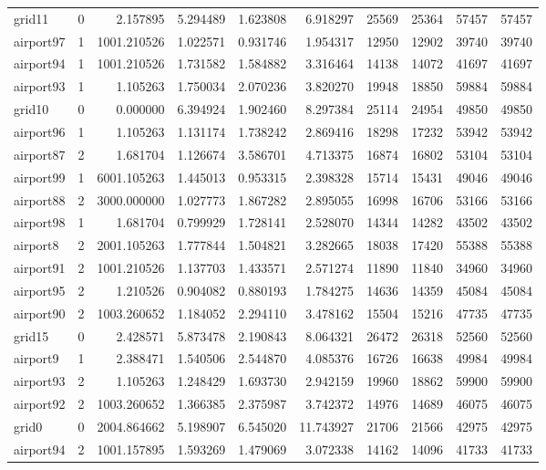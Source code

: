 \begin{longtable}{|l|r|r|r|r|r|r|r|r|r|}
grid11 & 0 & 2.157895 & 5.294489 & 1.623808 & 6.918297 & 25569 & 25364 & 57457 & 57457 \\
airport97 & 1 & 1001.210526 & 1.022571 & 0.931746 & 1.954317 & 12950 & 12902 & 39740 & 39740 \\
airport94 & 1 & 1001.210526 & 1.731582 & 1.584882 & 3.316464 & 14138 & 14072 & 41697 & 41697 \\
airport93 & 1 & 1.105263 & 1.750034 & 2.070236 & 3.820270 & 19948 & 18850 & 59884 & 59884 \\
grid10 & 0 & 0.000000 & 6.394924 & 1.902460 & 8.297384 & 25114 & 24954 & 49850 & 49850 \\
airport96 & 1 & 1.105263 & 1.131174 & 1.738242 & 2.869416 & 18298 & 17232 & 53942 & 53942 \\
airport87 & 2 & 1.681704 & 1.126674 & 3.586701 & 4.713375 & 16874 & 16802 & 53104 & 53104 \\
airport99 & 1 & 6001.105263 & 1.445013 & 0.953315 & 2.398328 & 15714 & 15431 & 49046 & 49046 \\
airport88 & 2 & 3000.000000 & 1.027773 & 1.867282 & 2.895055 & 16998 & 16706 & 53166 & 53166 \\
airport98 & 1 & 1.681704 & 0.799929 & 1.728141 & 2.528070 & 14344 & 14282 & 43502 & 43502 \\
airport8 & 2 & 2001.105263 & 1.777844 & 1.504821 & 3.282665 & 18038 & 17420 & 55388 & 55388 \\
airport91 & 2 & 1001.210526 & 1.137703 & 1.433571 & 2.571274 & 11890 & 11840 & 34960 & 34960 \\
airport95 & 2 & 1.210526 & 0.904082 & 0.880193 & 1.784275 & 14636 & 14359 & 45084 & 45084 \\
airport90 & 2 & 1003.260652 & 1.184052 & 2.294110 & 3.478162 & 15504 & 15216 & 47735 & 47735 \\
grid15 & 0 & 2.428571 & 5.873478 & 2.190843 & 8.064321 & 26472 & 26318 & 52560 & 52560 \\
airport9 & 1 & 2.388471 & 1.540506 & 2.544870 & 4.085376 & 16726 & 16638 & 49984 & 49984 \\
airport93 & 2 & 1.105263 & 1.248429 & 1.693730 & 2.942159 & 19960 & 18862 & 59900 & 59900 \\
airport92 & 2 & 1003.260652 & 1.366385 & 2.375987 & 3.742372 & 14976 & 14689 & 46075 & 46075 \\
grid0 & 0 & 2004.864662 & 5.198907 & 6.545020 & 11.743927 & 21706 & 21566 & 42975 & 42975 \\
airport94 & 2 & 1001.157895 & 1.593269 & 1.479069 & 3.072338 & 14162 & 14096 & 41733 & 41733 \\

\end{longtable}
